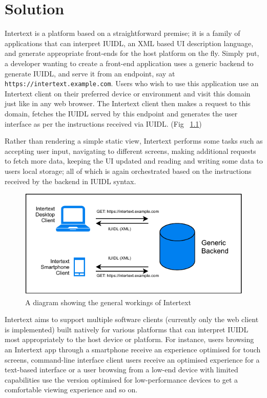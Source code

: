 
\chapter{Solution} \label{solution}


Intertext is a platform based on a straightforward premise; it is a family of applications that can interpret IUIDL, an XML based UI description language, and generate appropriate front-ends for the host platform on the fly. Simply put, a developer wanting to create a front-end application uses a generic backend to generate IUIDL, and serve it from an endpoint, say at \texttt{https://intertext.example.com}. Users who wish to use this application use an Intertext client on their preferred device or environment and visit this domain just like in any web browser. The Intertext client then makes a request to this domain, fetches the IUIDL served by this endpoint and generates the user interface as per the instructions received via IUIDL. (Fig ~\ref{fig:how_intertext_works})


Rather than rendering a simple static view, Intertext performs some tasks such as accepting user input, navigating to different screens, making additional requests to fetch more data, keeping the UI updated and reading and writing some data to users local storage; all of which is again orchestrated based on the instructions received by the backend in IUIDL syntax.


\begin{figure}
  \centering
  \includegraphics[width=13cm]{thesis/paper/images/how_it_works.pdf}
  \caption{A diagram showing the general workings of Intertext}%
  \label{fig:how_intertext_works}%
\end{figure}


Intertext aims to support multiple software clients (currently only the web client is implemented) built natively for various platforms that can interpret IUIDL most appropriately to the host device or platform. For instance, users browsing an Intertext app through a smartphone receive an experience optimised for touch screens, command-line interface client users receive an optimised experience for a text-based interface or a user browsing from a low-end device with limited capabilities use the version optimised for low-performance devices to get a comfortable viewing experience and so on. 

